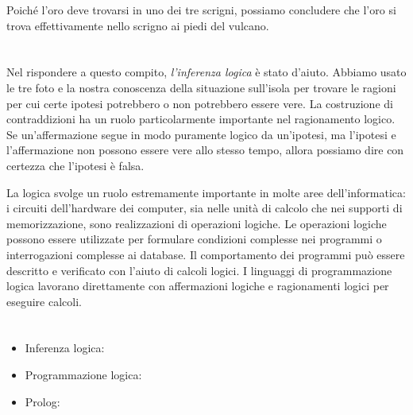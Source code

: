 {{Poiché l’oro deve trovarsi in uno dei tre scrigni, possiamo concludere che l’oro si trova effettivamente nello scrigno ai piedi del vulcano.



\section*{\BrochureItsInformatics}
Nel rispondere a questo compito, \emph{l’inferenza logica} è stato d’aiuto.
Abbiamo usato le tre foto e la nostra conoscenza della situazione sull’isola per trovare le ragioni per cui certe ipotesi potrebbero o non potrebbero essere vere.
La costruzione di contraddizioni ha un ruolo particolarmente importante nel ragionamento logico.
Se un’affermazione segue in modo puramente logico da un’ipotesi, ma l’ipotesi e l’affermazione non possono essere vere allo stesso tempo, allora possiamo dire con certezza che l’ipotesi è falsa.

La logica svolge un ruolo estremamente importante in molte aree dell’informatica: i circuiti dell’hardware dei computer, sia nelle unità di calcolo che nei supporti di memorizzazione, sono realizzazioni di operazioni logiche.  Le operazioni logiche possono essere utilizzate per formulare condizioni complesse nei programmi o interrogazioni complesse ai database.  Il comportamento dei programmi può essere descritto e verificato con l’aiuto di calcoli logici.  I linguaggi di programmazione logica lavorano direttamente con affermazioni logiche e ragionamenti logici per eseguire calcoli.



\section*{\BrochureWebsitesAndKeywords}
{\raggedright
\begin{itemize}
  \item Inferenza logica: \href{https://it.wikipedia.org/wiki/Inferenza}{}
  \item Programmazione logica: \href{https://it.wikipedia.org/wiki/Programmazione_logica}{}
  \item Prolog: \href{https://it.wikipedia.org/wiki/Prolog}{}
\end{itemize}


}}}
